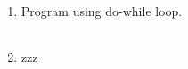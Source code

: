 \documentclass{exam}
\begin{document}
\begin{enumerate}
   \item  Program  using do-while loop.

   \begin{myTableStyle}
   \begin{center} \begin{tabular}{ |m{14cm}| } \hline
              \\ \hline
    \end{tabular} \end{center}
\end{myTableStyle}
  \pagebreak

  \item  zzz
  \end{enumerate}
\end{document}
